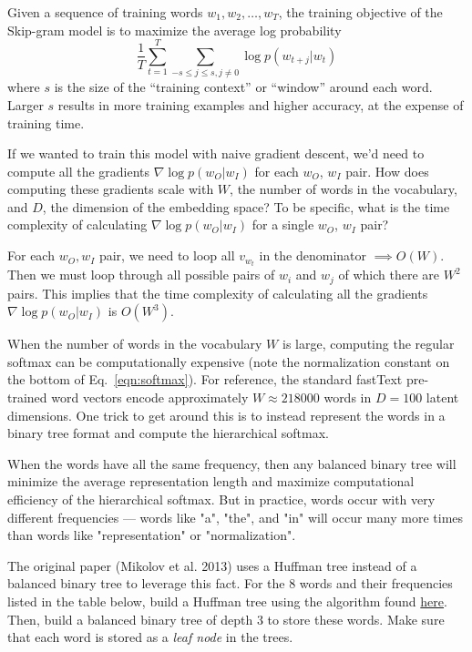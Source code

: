 Given a sequence of training words $w_1, w_2, \hdots, w_T$, the training objective of the Skip-gram model is to maximize the average log probability
\[ \frac{1}{T}  \sum_{t=1}^T \sum_{-s \leq j \leq s, j \neq 0} \log p(w_{t+j}|w_t) \tag{1}\label{eqn:opt} \] where $s$ is the size of the ``training context'' or ``window'' around each word. Larger $s$ results in more training examples and higher accuracy, at the expense of training time.

\problem[5]
If we wanted to train this model with naive gradient descent, we'd need to compute all the gradients $\nabla \log p(w_O|w_I)$ for each $w_O$, $w_I$ pair.  How does computing these gradients scale with $W$, the number of words in the vocabulary, and $D$, the dimension of the embedding space? To be specific, what is the time complexity of calculating $\nabla \log p(w_O|w_I)$ for a single $w_O$, $w_I$ pair?

\begin{solution}
	For each $w_O, w_I$ pair, we need to loop all $v_{w_t}$ in the denominator $\implies O(W)$. Then we must loop through all possible pairs of $w_i$ and $w_j$ of which there are $W^2$ pairs. This implies that the time complexity of calculating all the gradients $\nabla \log p(w_O|w_I)$ is $O(W^3)$.
\end{solution}


\problem[10]
When the number of words in the vocabulary $W$ is large, computing the regular softmax can be computationally expensive (note the normalization constant on the bottom of Eq.~\ref{eqn:softmax}). For reference, the standard fastText pre-trained word vectors encode approximately $W \approx 218000$ words in $D=100$ latent dimensions. One trick to get around this is to instead represent the words in a binary tree format and compute the hierarchical softmax.

When the words have all the same frequency, then any balanced binary tree will minimize the average representation length and maximize computational efficiency of the hierarchical softmax. But in practice, words occur with very different frequencies --- words like "a", "the", and "in" will occur many more times than words like "representation" or "normalization".

The original paper (Mikolov et al. 2013) uses a Huffman tree instead of a balanced binary tree to leverage this fact. For the 8 words and their frequencies listed in the table below, build a Huffman tree using the algorithm found \href{https://web.archive.org/web/20190526120959/https://www.siggraph.org//education/materials/HyperGraph/video/mpeg/mpegfaq/huffman_tutorial.html}{here}.
Then, build a balanced binary tree of depth 3 to store these words. 
Make sure that each word is stored as a \emph{leaf node} in the trees.

